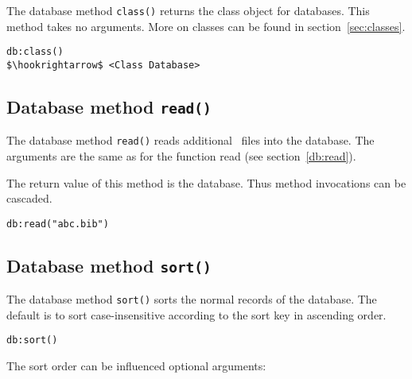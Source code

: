 \documentclass[11pt,a4paper]{scrbook}
\makeatletter
\newcommand\rsc[1]{\textsf{#1}\index{#1@\textsf{#1}}}
\makeatother
\begin{document}
The database method \texttt{class()} returns the class object for databases.
This method takes no arguments. More on classes can be found in
section~\ref{sec:classes}.

\begin{lstlisting}[language=BibTool,mathescape=true]
db:class()
$\hookrightarrow$ <Class Database>
\end{lstlisting}

\subsection{Database method \texttt{read()}}

The database method \texttt{read()} reads additional \BibTeX\ files into the
database. The arguments are the same as for the function \rsc{read} (see
section~\ref{db:read}).

The return value of this method is the database. Thus method invocations can
be cascaded.

\begin{lstlisting}[language=BibTool,mathescape=true]
db:read("abc.bib")
\end{lstlisting}

\subsection{Database method \texttt{sort()}}

The database method \texttt{sort()} sorts the normal records of the
database. The default is to sort case-insensitive according to the sort key in
ascending order.

\begin{lstlisting}[language=BibTool,mathescape=true]
db:sort()
\end{lstlisting}

The sort order can be influenced optional arguments:
\end{document}
